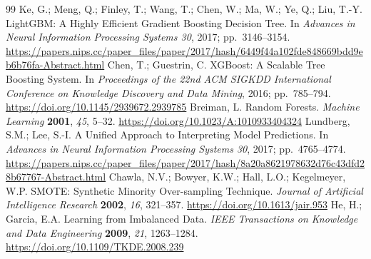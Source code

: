 \begin{thebibliography}{99}
Ke, G.; Meng, Q.; Finley, T.; Wang, T.; Chen, W.; Ma, W.; Ye, Q.; Liu, T.-Y.
LightGBM: A Highly Efficient Gradient Boosting Decision Tree.
In \emph{Advances in Neural Information Processing Systems 30}, 2017;
pp.~3146--3154.
\url{https://papers.nips.cc/paper_files/paper/2017/hash/6449f44a102fde848669bdd9eb6b76fa-Abstract.html}
Chen, T.; Guestrin, C.
XGBoost: A Scalable Tree Boosting System.
In \emph{Proceedings of the 22nd ACM SIGKDD International Conference on
Knowledge Discovery and Data Mining}, 2016; pp.~785--794.
\url{https://doi.org/10.1145/2939672.2939785}
Breiman, L.
Random Forests.
\emph{Machine Learning} \textbf{2001}, \emph{45}, 5--32.
\url{https://doi.org/10.1023/A:1010933404324}
Lundberg, S.M.; Lee, S.-I.
A Unified Approach to Interpreting Model Predictions.
In \emph{Advances in Neural Information Processing Systems 30}, 2017;
pp.~4765--4774.
\url{https://papers.nips.cc/paper_files/paper/2017/hash/8a20a8621978632d76c43dfd28b67767-Abstract.html}
Chawla, N.V.; Bowyer, K.W.; Hall, L.O.; Kegelmeyer, W.P.
SMOTE: Synthetic Minority Over-sampling Technique.
\emph{Journal of Artificial Intelligence Research} \textbf{2002}, \emph{16},
321--357.
\url{https://doi.org/10.1613/jair.953}
He, H.; Garcia, E.A.
Learning from Imbalanced Data.
\emph{IEEE Transactions on Knowledge and Data Engineering} \textbf{2009},
\emph{21}, 1263--1284.
\url{https://doi.org/10.1109/TKDE.2008.239}


\end{thebibliography}
